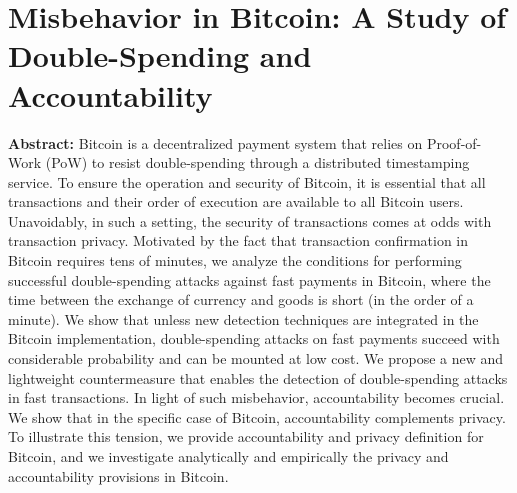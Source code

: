 \section{Misbehavior in Bitcoin: A Study of Double-Spending and Accountability}

\textbf{Abstract:} 
Bitcoin is a decentralized payment system that relies on Proof-of-Work (PoW) to resist double-spending through a distributed timestamping service. To ensure the operation and security of Bitcoin, it is essential that all transactions and their order of execution are available to all Bitcoin users. Unavoidably, in such a setting, the security of transactions comes at odds with transaction privacy. Motivated by the fact that transaction confirmation in Bitcoin requires tens of minutes, we analyze the conditions for performing successful double-spending attacks against fast payments in Bitcoin, where the time between the exchange of currency and goods is short (in the order of a minute). We show that unless new detection techniques are integrated in the Bitcoin implementation, double-spending attacks on fast payments succeed with considerable probability and can be mounted at low cost. We propose a new and lightweight countermeasure that enables the detection of double-spending attacks in fast transactions. In light of such misbehavior, accountability becomes crucial. We show that in the specific case of Bitcoin, accountability complements privacy. To illustrate this tension, we provide accountability and privacy definition for Bitcoin, and we investigate analytically and empirically the privacy and accountability provisions in Bitcoin.

